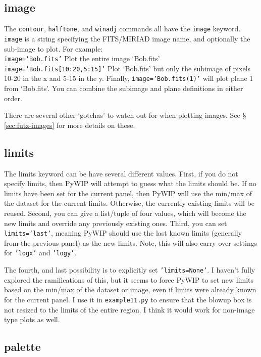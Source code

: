 \documentclass[12pt]{article}
\newcommand{\pywip}{PyWIP}
\begin{document}
\subsection{image}

The \texttt{contour}, \texttt{halftone}, and \texttt{winadj} commands all have
the \texttt{image} keyword.  \texttt{image} is a string specifying the
FITS/MIRIAD image name, and optionally the sub-image to plot.  For example:\\
\texttt{image='Bob.fits'} Plot the entire image `Bob.fits'\\
\texttt{image='Bob.fits[10:20,5:15]'} Plot `Bob.fits' but only the subimage of
pixels 10-20 in the x and 5-15 in the y.  Finally, \texttt{image='Bob.fits(1)'}
will plot plane 1 from `Bob.fits'.  You can combine the subimage and plane
definitions in either order.

There are several other `gotchas' to watch out for when plotting images.
See \S\,\ref{sec:futz-images} for more details on these.

\subsection{limits}

The limits keyword can be have several different values.  First, if you do not
specify limits, then \pywip{} will attempt to guess what the limits should be.
If no limits have been set for the current panel, then \pywip{} will use the 
min/max of the dataset for the current limits.  Otherwise, the currently
existing limits will be reused.  Second, you can give a list/tuple of four
values, which will become the new limits and override any previously existing
ones.  Third, you can set \texttt{limits='last'}, meaning \pywip{} should
use the last known limits (generally from the previous panel) as the new limits.
Note, this will also carry over settings for \texttt{'logx'} and 
\texttt{'logy'}.

The fourth, and last possibility is to explicitly set \texttt{'limits=None'}. I
haven't fully explored the ramifications of this, but it seems to force \pywip{}
to set new limits based on the min/max of the dataset or image, even if limits
were already known for the current panel. I use it in \texttt{example11.py} to
ensure that the blowup box is not resized to the limits of the entire region. I
think it would work for non-image type plots as well.

\subsection{palette}
\end{document}
